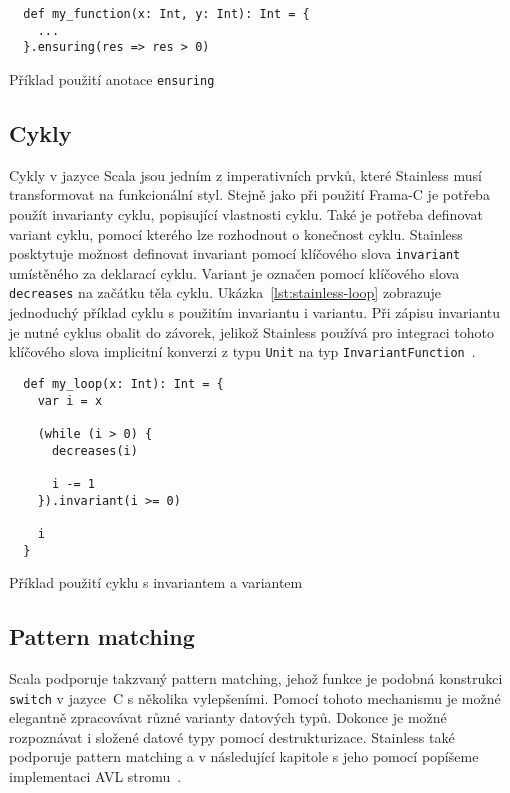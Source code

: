 \begin{listing}[H]
  \begin{verbatim}
  def my_function(x: Int, y: Int): Int = {
    ...
  }.ensuring(res => res > 0)
  \end{verbatim}
  \caption{Příklad použití anotace \texttt{ensuring}}
  \label{lst:stainless-ensuring}
\end{listing}

\subsection{Cykly}
\label{subsec:stainless-loops}

Cykly v jazyce Scala jsou jedním z imperativních prvků,
které Stainless musí transformovat na funkcionální styl.
Stejně jako při použití Frama\mbox{-}C je potřeba použít invarianty cyklu,
popisující vlastnosti cyklu.
Také je potřeba definovat variant cyklu,
pomocí kterého lze rozhodnout o konečnost cyklu.
Stainless posktytuje možnost definovat invariant pomocí klíčového slova \texttt{invariant}
umístěného za deklarací cyklu.
Variant je označen pomocí klíčového slova \texttt{decreases} na začátku těla cyklu.
Ukázka~\ref{lst:stainless-loop} zobrazuje jednoduchý příklad cyklu s použitím invariantu i variantu.
Při zápisu invariantu je nutné cyklus obalit do závorek,
jelikož Stainless používá pro integraci tohoto klíčového slova
implicitní konverzi z typu \texttt{Unit} na typ \texttt{InvariantFunction}~\cite{StainlessDocs}.

\begin{listing}[H]
  \begin{verbatim}
  def my_loop(x: Int): Int = {
    var i = x

    (while (i > 0) {
      decreases(i)

      i -= 1
    }).invariant(i >= 0)

    i
  }
  \end{verbatim}
  \caption{Příklad použití cyklu s invariantem a variantem}
  \label{lst:stainless-loop}
\end{listing}

\subsection{Pattern matching}
\label{subsec:stainless-pattern-matching}

Scala podporuje takzvaný pattern matching,
jehož funkce je podobná konstrukci \texttt{switch} v jazyce~C s několika vylepšeními.
Pomocí tohoto mechanismu je možné elegantně zpracovávat různé varianty datových typů.
Dokonce je možné rozpoznávat i složené datové typy pomocí destrukturizace.
Stainless také podporuje pattern matching a v následující kapitole s jeho pomocí
popíšeme implementaci AVL stromu~\cite{scalaPatternMatching}.

